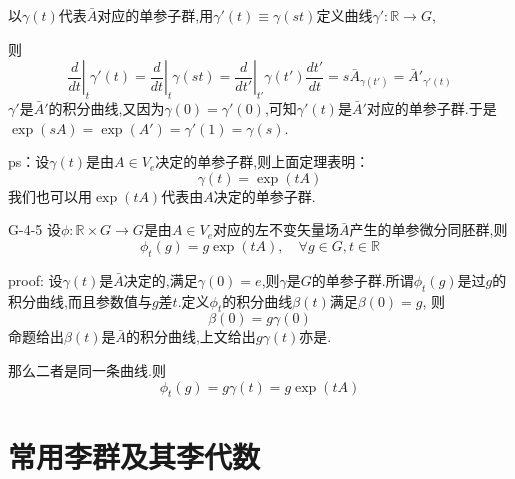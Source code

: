 \documentclass[../main.tex]{subfiles}
\begin{document}
 以$\gamma(t)$代表$\bar{A}$对应的单参子群,用$\gamma'(t)\equiv \gamma(st)$定义曲线$\gamma' :\mathbb{R}\rightarrow G$,

 则
 $$ \left.\frac{d}{dt}\right|_t \gamma'(t) = \left.\frac{d}{dt}\right|_t \gamma(st) = \left.\frac{d}{dt'}\right|_{t'}\gamma(t')\frac{dt'}{dt} = s\bar{A}_{\gamma(t')} = \bar{A}'_{\gamma'(t)} $$
 $\gamma'$是$\bar{A}'$的积分曲线,又因为$\gamma(0) = \gamma'(0)$,可知$\gamma'(t)$是$\bar{A}'$对应的单参子群.于是$\exp(sA) = \exp(A') = \gamma'(1) = \gamma(s)$.

 ps：设$\gamma(t)$是由$A\in V_e$决定的单参子群,则上面定理表明：
     $$ \gamma(t)= \exp(tA) $$
 我们也可以用$\exp(tA)$代表由$A$决定的单参子群.
\begin{theorem}{}{G-4-5}
	设$\phi:\mathbb{R} \times G\rightarrow G$是由$A\in V_e$对应的左不变矢量场$\bar{A}$产生的单参微分同胚群,则
	$$ \phi_t(g)= g\exp(tA),\quad \forall g\in G, t\in \mathbb{R} $$
\end{theorem}
 proof: 设$\gamma(t)$是$\bar{A}$决定的,满足$\gamma(0)=e$,则$\gamma$是$G$的单参子群.所谓$\phi_t(g)$是过$g$的积分曲线,而且参数值与$g$差$t$.定义$\phi_t$的积分曲线$\beta(t)$满足$\beta(0) = g$,
 则
     $$ \beta(0) = g\gamma(0) $$
 命题给出$\beta(t)$是$\bar{A}$的积分曲线,上文给出$g\gamma(t)$亦是.

 那么二者是同一条曲线.则
 $$ \phi_t(g) = g\gamma(t) = g\exp(tA) $$
 \chapter{常用李群及其李代数}
\end{document}
